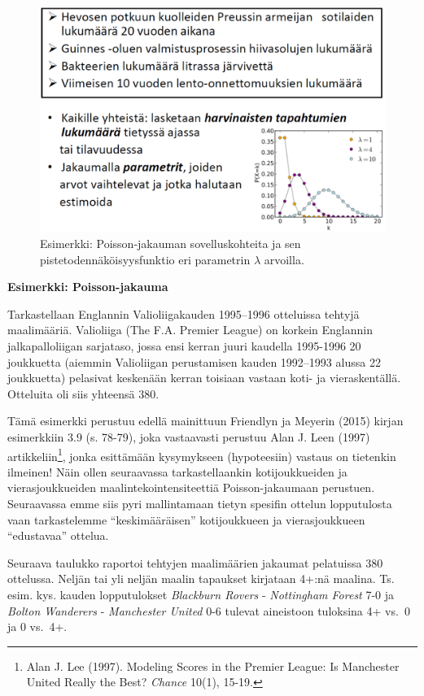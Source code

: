 \documentclass[
]{book}
\begin{document}
\begin{figure}

{\centering \includegraphics[width=1\linewidth]{images/poisson} 

}

\caption{Esimerkki: Poisson-jakauman sovelluskohteita ja sen pistetodennäköisyysfunktio eri parametrin $\lambda$ arvoilla.}\label{fig:poisson}
\end{figure}

\begin{eblock}{}
\textbf{Esimerkki: Poisson-jakauma}

Tarkastellaan Englannin Valioliigakauden 1995--1996 otteluissa tehtyjä maalimääriä. Valioliiga (The F.A. Premier League) on korkein Englannin jalkapalloliigan sarjataso, jossa ensi kerran juuri kaudella 1995-1996 20 joukkuetta (aiemmin Valioliigan perustamisen kauden 1992--1993 alussa 22 joukkuetta) pelasivat keskenään kerran toisiaan vastaan koti- ja vieraskentällä. Otteluita oli siis yhteensä 380.

Tämä esimerkki perustuu edellä mainittuun Friendlyn ja Meyerin (2015) kirjan esimerkkiin 3.9 (s. 78-79), joka vastaavasti perustuu Alan J. Leen (1997) artikkeliin\footnote{Alan J. Lee (1997). Modeling Scores in the Premier League: Is Manchester United Really the Best? \emph{Chance} 10(1), 15-19.}, jonka esittämään kysymykseen (hypoteesiin) vastaus on tietenkin ilmeinen! Näin ollen seuraavassa tarkastellaankin kotijoukkueiden ja vierasjoukkueiden maalintekointensiteettiä Poisson-jakaumaan perustuen. Seuraavassa emme siis pyri mallintamaan tietyn spesifin ottelun lopputulosta vaan tarkastelemme ``keskimääräisen'' kotijoukkueen ja vierasjoukkueen ``edustavaa'' ottelua.

Seuraava taulukko raportoi tehtyjen maalimäärien jakaumat pelatuissa 380 ottelussa. Neljän tai yli neljän maalin tapaukset kirjataan 4+:nä maalina. Ts. esim. kys. kauden lopputulokset \emph{Blackburn Rovers} - \emph{Nottingham Forest} 7-0 ja \emph{Bolton Wanderers} - \emph{Manchester United} 0-6 tulevat aineistoon tuloksina 4+ vs.~0 ja 0 vs.~4+.

\end{eblock}
\end{document}
